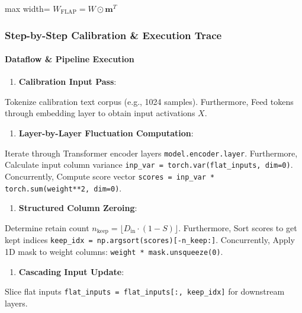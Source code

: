 \begin{center}
\begin{adjustbox}{max width=\columnwidth}
$\displaystyle
W_{\text{FLAP}} = W \odot \mathbf{m}^T
$
\end{adjustbox}
\end{center}


\subsubsection*{Step-by-Step Calibration \& Execution Trace}

\paragraph{Dataflow \& Pipeline Execution}

\begin{enumerate}
\item \textbf{Calibration Input Pass}:
\end{enumerate}
Tokenize calibration text corpus (e.g., 1024 samples). Furthermore, Feed tokens through embedding layer to obtain input activations $X$.

\begin{enumerate}
\item \textbf{Layer-by-Layer Fluctuation Computation}:
\end{enumerate}
Iterate through Transformer encoder layers \texttt{model.encoder.layer}. Furthermore, Calculate input column variance \texttt{inp\_var = torch.var(flat\_inputs, dim=0)}. Concurrently, Compute score vector \texttt{scores = inp\_var * torch.sum(weight**2, dim=0)}.

\begin{enumerate}
\item \textbf{Structured Column Zeroing}:
\end{enumerate}
Determine retain count $n_{\text{keep}} = \lfloor D_{\text{in}} \cdot (1 - S) \rfloor$. Furthermore, Sort scores to get kept indices \texttt{keep\_idx = np.argsort(scores)[-n\_keep:]}. Concurrently, Apply 1D mask to weight columns: \texttt{weight * mask.unsqueeze(0)}.

\begin{enumerate}
\item \textbf{Cascading Input Update}:
\end{enumerate}
Slice flat inputs \texttt{flat\_inputs = flat\_inputs[:, keep\_idx]} for downstream layers.



